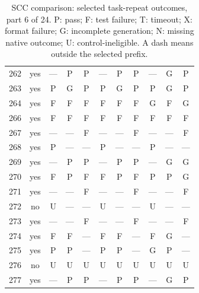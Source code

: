 \begin{table}[p]
\begin{tabular*}{\textwidth}{@{\extracolsep{\fill}}rc*{9}{c}@{}}
262 & yes & — & P & P & — & P & P & — & G & P\\
263 & yes & P & G & P & P & G & P & P & G & P\\
264 & yes & F & F & F & F & F & F & G & F & G\\
266 & yes & F & F & F & F & F & F & F & F & F\\
267 & yes & — & — & F & — & — & F & — & — & F\\
268 & yes & P & — & — & P & — & — & P & — & —\\
269 & yes & — & P & P & — & P & P & — & G & G\\
270 & yes & F & P & F & F & P & F & P & P & G\\
271 & yes & — & — & F & — & — & F & — & — & F\\
272 & no & U & — & — & U & — & — & U & — & —\\
273 & yes & — & — & F & — & — & F & — & — & F\\
274 & yes & F & F & — & F & F & — & F & G & —\\
275 & yes & P & P & — & P & P & — & G & P & —\\
276 & no & U & U & U & U & U & U & U & U & U\\
277 & yes & — & P & P & — & P & P & — & G & P\\
\bottomrule\end{tabular*}
\caption{SCC comparison: selected task-repeat outcomes, part 6 of 24. P: pass; F: test failure; T: timeout; X: format failure; G: incomplete generation; N: missing native outcome; U: control-ineligible. A dash means outside the selected prefix.}
\end{table}
\clearpage
